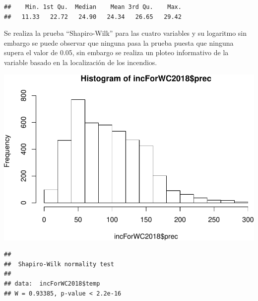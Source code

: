 \documentclass[11pt,]{article}
\newenvironment{Shaded}{\begin{snugshade}}{\end{snugshade}}
\newcommand{\KeywordTok}[1]{\textcolor[rgb]{0.13,0.29,0.53}{\textbf{#1}}}
\newcommand{\CommentTok}[1]{\textcolor[rgb]{0.56,0.35,0.01}{\textit{#1}}}
\newcommand{\OperatorTok}[1]{\textcolor[rgb]{0.81,0.36,0.00}{\textbf{#1}}}
\newcommand{\NormalTok}[1]{#1}
\begin{document}
\begin{verbatim}
##    Min. 1st Qu.  Median    Mean 3rd Qu.    Max. 
##   11.33   22.72   24.90   24.34   26.65   29.42
\end{verbatim}

Se realiza la prueba ``Shapiro-Wilk'' para las cuatro variables y su
logaritmo sin embargo se puede observar que ninguna pasa la prueba
puesta que ninguna supera el valor de 0.05, sin embargo se realiza un
ploteo informativo de la variable basado en la localización de los
incendios.

\begin{Shaded}
\end{Shaded}

\includegraphics{proyecto_files/figure-latex/unnamed-chunk-36-1.pdf}

\begin{Shaded}
\end{Shaded}

\begin{verbatim}
## 
##  Shapiro-Wilk normality test
## 
## data:  incForWC2018$temp
## W = 0.93385, p-value < 2.2e-16
\end{verbatim}

\begin{Shaded}
\end{Shaded}
\end{document}
